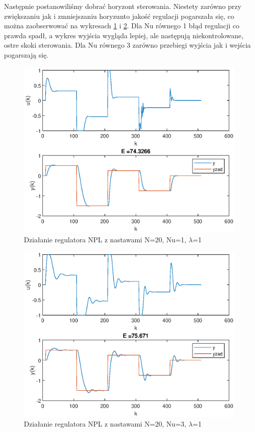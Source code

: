 		\newpage
		Następnie postanowiliśmy dobrać horyzont sterowania. Niestety zarówno przy zwiększaniu jak i zmniejszaniu horyzunto jakość regulacji pogarszała się, co można zaobserwować na wykresach \ref{fig:NPL2} i \ref{fig:NPL3}. Dla Nu równego 1 błąd regulacji co prawda spadł, a wykres wyjścia wygląda lepiej, ale następują niekontrolowane, ostre skoki sterowania. Dla Nu równego 3 zarówno przebiegi wyjścia jak i wejścia pogarszają się.
		\begin{figure}[h!]
			\centering
			\includegraphics[width=0.7\linewidth]{img/NPLNu1.eps}
			\caption{Działanie regulatora NPL z nastawami N=20, Nu=1, $\lambda$=1}
			\label{fig:NPL2}
		\end{figure}
		
		\begin{figure}[h!]
			\centering
			\includegraphics[width=0.7\linewidth]{img/NPLNu3.eps}
			\caption{Działanie regulatora NPL z nastawami N=20, Nu=3, $\lambda$=1}
			\label{fig:NPL3}
		\end{figure}
		
